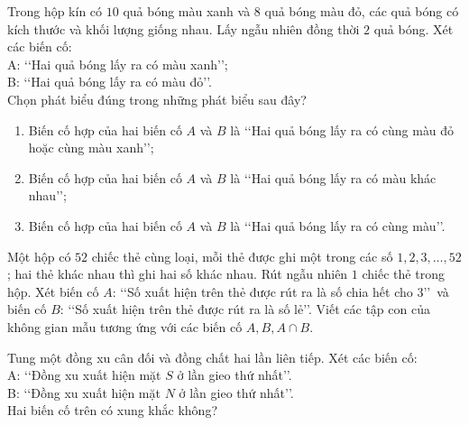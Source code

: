 \begin{vd}%
	Trong hộp kín có $10$ quả bóng màu xanh và $8$ quả bóng màu đỏ, các quả bóng có kích thước và khối lượng giống nhau. Lấy ngẫu nhiên đồng thời $2$ quả bóng. Xét các biến cố:\\
	A: \lq\lq  Hai quả bóng lấy ra có màu xanh\rq\rq;\\
	B: \lq\lq  Hai quả bóng lấy ra có màu đỏ\rq\rq.\\
	Chọn phát biểu đúng trong những phát biểu sau đây?
	\begin{enumerate}
		\item Biến cố hợp của hai biến cố $A$ và $B$ là \lq\lq  Hai quả bóng lấy ra có cùng màu đỏ hoặc cùng màu xanh\rq\rq;
		\item Biến cố hợp của hai biến cố $A$ và $B$ là \lq\lq  Hai quả bóng lấy ra có màu khác nhau\rq\rq;
		\item Biến cố hợp của hai biến cố $A$ và $B$ là \lq\lq  Hai quả bóng lấy ra có cùng màu\rq\rq.
	\end{enumerate}
\end{vd}
\begin{vd}%
	Một hộp có $52$ chiếc thẻ cùng loại, mỗi thẻ được ghi một trong các số $1,2,3, \ldots, 52$; hai thẻ khác nhau thì ghi hai số khác nhau. Rút ngẫu nhiên $1$ chiếc thẻ trong hộp. Xét biến cố $A$: \lq\lq  Số xuất hiện trên thẻ được rút ra là số chia hết cho 3\rq\rq \, và biến cố $B$: \lq\lq  Số xuất hiện trên thẻ được rút ra là số lẻ\rq\rq. Viết các tập con của không gian mẫu tương ứng với các biến cố $A, B, A \cap B$.
\end{vd}
\begin{vd}%
	Tung một đồng xu cân đối và đồng chất hai lần liên tiếp. Xét các biến cố:\\
	A: \lq\lq  Đồng xu xuất hiện mặt $S$ ở lần gieo thứ nhất\rq\rq.\\
	B: \lq\lq  Đồng xu xuất hiện mặt $N$ ở lần gieo thứ nhất\rq\rq.\\
	Hai biến cố trên có xung khắc không?\\
\end{vd}
